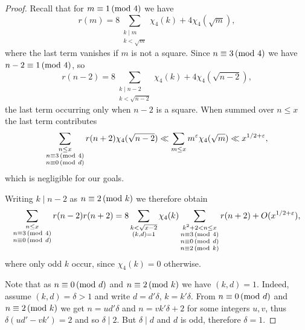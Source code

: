 \documentclass[12pt]{amsart}
\theoremstyle{remark}
\renewcommand{\pmod}[1]{\mkern3mu(\mathrm{mod}\ #1)}
\begin{document}
\begin{proof}
    Recall that for $m \equiv 1 \pmod 4$ we have
    \[
    	r(m) = 8 \sum_{\substack{k \mid m \\ k < \sqrt{m}}} \chi_4(k)+4\chi_4(\sqrt{m}),
    \]
    where the last term vanishes if $m$ is not a square.
    Since $n\equiv 3 \pmod 4$ we have $n-2 \equiv 1  \pmod 4$, so
    \[
        r(n-2) = 8\sum_{ \substack{k\mid n-2 \\ k<\sqrt{n-2}}}\chi_4(k)+4\chi_4(\sqrt{n-2}),
    \]
    the last term occurring only when $n-2$ is a square.
    When summed over $n \le x$ the last term contributes
    \[
        \sum_{\substack{n\le x\\ n \equiv 3 \pmod 4 \\ n \equiv 0 \pmod d}}r(n+2) \chi_4 (\sqrt{n-2}) \ll \sum_{m \le x} m^{\varepsilon} \chi_4(\sqrt{m}) \ll x^{1/2+\varepsilon},
    \]
    which is negligible for our goals.

    Writing $k\mid n-2$ as $n\equiv2\pmod k$ we therefore obtain
    \[
        \sum_{\substack{n\le x\\ n \equiv 3 \pmod 4 \\ n \equiv 0 \pmod d}}r(n-2)r(n+2)
        = 8 \sum_{\substack{k < \sqrt {x-2}\\ (k,d) = 1}} \chi_4(k)\sum_{\substack{k^2+2 < n \le x\\ n \equiv 3 \pmod 4 \\ n \equiv 0 \pmod d \\ n \equiv 2 \pmod k}} r(n+2) + O(x^{1/2+\varepsilon}),
    \]
    where only odd $k$ occur, since $\chi_4(k) = 0$ otherwise.
    
    Note that as $n \equiv 0 \pmod d$ and $n \equiv 2 \pmod k$ we have $(k,d)=1$.
    Indeed, assume $(k,d) = \delta > 1$ and write $d = d'\delta$, $k = k'\delta$.
    From $n \equiv 0 \pmod d$ and $n \equiv 2 \pmod k$ we get $n = ud'\delta$ and $n = vk'\delta+2$ for
    some integers $u,v$, thus $\delta(ud'-vk') = 2$ and so $\delta \mid 2$. But $\delta \mid d$ and
    $d$ is odd, therefore $\delta = 1$.
    

\end{proof}
\end{document}
